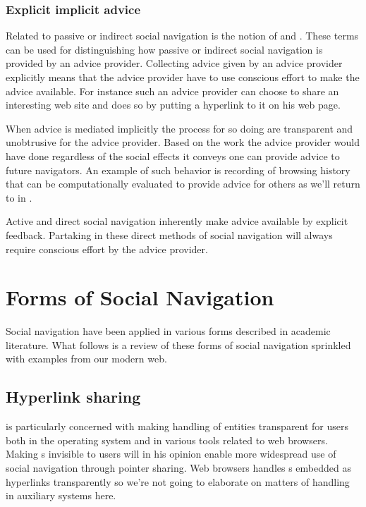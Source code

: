 \subsubsection{Explicit \oldand implicit advice}
\label{section:social.navigation.fundamental.categorization.explicit.implicit}

Related to passive or indirect social navigation is the notion
of  and .
These terms can be used for distinguishing how
passive or indirect social navigation is provided by an advice provider.
Collecting advice given by an advice provider explicitly means that
the advice provider have to use conscious effort to make the advice available.
For instance such an advice provider can choose to share an interesting web
site and does so by putting a hyperlink to it on his web page.

When advice is mediated implicitly the process for so doing are transparent
and unobtrusive for the advice provider. Based on the work the advice provider
would have done regardless of the social effects it conveys one can provide
advice to future navigators. An example of such behavior is recording of
browsing history that can be computationally evaluated to provide advice for
others as we'll return to in
.

Active and direct social navigation inherently make advice available by
explicit feedback. Partaking in these direct methods of social navigation
will always require conscious effort by the advice provider.

\section{Forms of Social Navigation}

Social navigation have been applied in various forms described in
academic literature. What follows is a review of these forms of social
navigation sprinkled with examples from our modern web.

\subsection{Hyperlink sharing}

\citet{dieberger97} is particularly concerned with making handling of
%
entities transparent for users both in the operating system and in various
tools related to web browsers. Making s invisible to users will in
his opinion enable more widespread use of social navigation through pointer
sharing. Web browsers handles s embedded as hyperlinks transparently
so we're not going to elaborate on matters of  handling in
auxiliary systems here.

